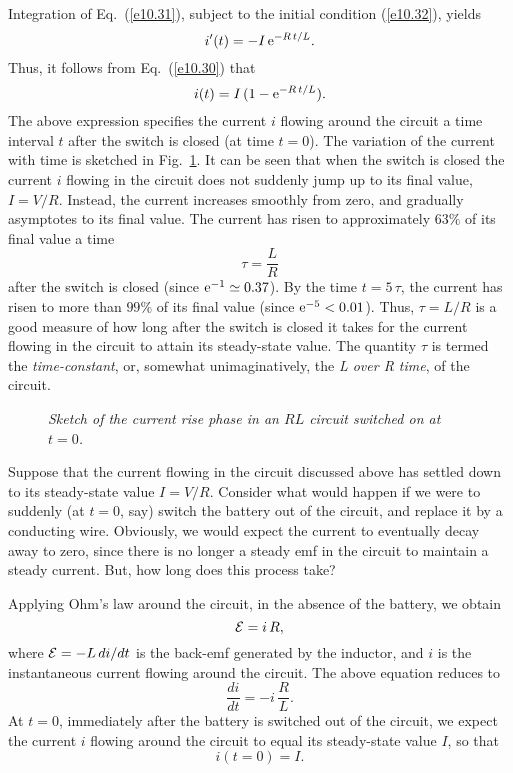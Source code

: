 Integration of Eq.~(\ref{e10.31}), subject to the initial condition
(\ref{e10.32}), yields
\begin{equation}
i'(t) = -I\,{\rm e}^{-R\,t/L}.
\end{equation}
Thus, it follows from Eq.~(\ref{e10.30}) that
\begin{equation}
i(t) = I\,(1-{\rm e}^{-R\,t/L}).
\end{equation}
The above expression specifies the current $i$ flowing around the circuit
a time interval $t$ after the switch is closed (at time $t=0$). The variation of
the current with time is sketched in Fig.~\ref{f10.4}. 
It can be seen that
when the switch is closed the current $i$ flowing in the circuit does not suddenly
jump up to its final value, $I=V/R$. Instead, the current increases smoothly
from zero, and gradually asymptotes to its final value. The current
has risen to  approximately $63\%$ of its
final value a time
\begin{equation}
\tau = \frac{L}{R}
\end{equation}
after the switch is closed (since ${\rm e}^{-1} \simeq 0.37$). By the time $t=5\,\tau$, the current has risen to
more than $99\%$ of its final value (since ${\rm e}^{-5}< 0.01$). Thus, $\tau=L/R$ is a good measure of
how long after the
switch is closed it takes for the current flowing in the circuit to attain its steady-state
value. The quantity $\tau$ is termed the {\em time-constant}, or, somewhat
unimaginatively,  the {\em L over R time}, of the circuit.

\begin{figure}
\epsfysize=2in
\centerline{}
\caption{\em Sketch of the current rise phase in an $RL$ circuit switched
on at $t=0$.}\label{f10.4}
\end{figure}

Suppose that the current flowing in the circuit discussed above has settled
down to its steady-state value $I=V/R$. 
Consider what would happen
if we were to suddenly (at $t=0$, say) switch the battery out
of the circuit, and replace it by a conducting wire. Obviously,
we would expect the current to
eventually decay away to zero, since there is no longer a steady emf in the circuit
to maintain a steady current. But, how long does this process take?

Applying Ohm's law around the circuit, in the absence of the battery,
we obtain
\begin{equation}
{\cal E} = i\,R,
\end{equation}
where ${\cal E}= - L\,di/dt$ is the back-emf generated
by the inductor, and $i$ is the instantaneous current flowing around the circuit. 
The above equation reduces to
\begin{equation}\label{e10.42}
\frac{di}{dt} = -i\,\frac{R}{L}.
\end{equation}
At $t=0$, immediately after the battery is switched out of the circuit,
we expect the current $i$ flowing around the circuit to equal its
steady-state value $I$, so that
\begin{equation}\label{e10.43}
i(t=0)=I.
\end{equation}

